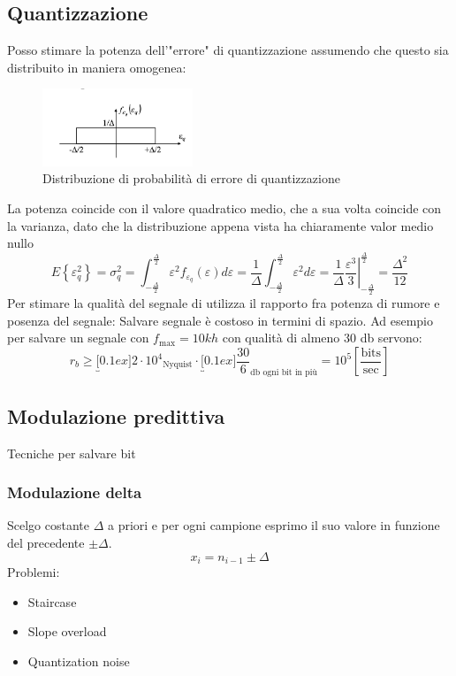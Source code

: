 \subsection{Quantizzazione}
Posso stimare la potenza dell'"errore" di quantizzazione assumendo che questo sia distribuito in maniera omogenea:
\begin{figure}[H]
	\begin{center}
		\includegraphics[width = 0.4\textwidth]{Images/Quantizzazione 1.png}
	\end{center}
	\caption{Distribuzione di probabilità di errore di quantizzazione}
\end{figure}
La potenza coincide con il valore quadratico medio, che a sua volta
coincide con la varianza, dato che la distribuzione appena vista ha
chiaramente valor medio nullo
\[
	E\left\{\varepsilon_q^2\right\}=\sigma_q^2=\int_{-\frac{\Delta}{2}}^{\frac{\Delta}{2}} \varepsilon^2 f_{\varepsilon_q}(\varepsilon) d \varepsilon=\frac{1}{\Delta} \int_{-\frac{\Delta}{2}}^{\frac{\Delta}{2}} \varepsilon^2 d \varepsilon=\left.\frac{1}{\Delta} \frac{\varepsilon^3}{3}\right|_{-\frac{\Delta}{2}} ^{\frac{\Delta}{2}}=\frac{\Delta^2}{12}
\]
Per stimare la qualità del segnale di utilizza il rapporto fra potenza di rumore e posenza del segnale:
Salvare segnale è costoso in termini di spazio. Ad esempio per salvare un segnale con $ f_{\text{max}} = 10 kh $ con qualità di almeno 30 db servono:
\[
	r_b \ge \underbracket[0.1ex]{2 \cdot  10^{4}}_{\text{Nyquist}} \cdot \underbracket[0.1ex]{\frac{30}{6}}_{\text{db ogni bit in più}} = 10^{5} \left[\frac{\text{bits}}{\text{sec}}\right]
\]
\subsection{Modulazione predittiva}
Tecniche per salvare bit
\subsubsection*{Modulazione delta}
Scelgo costante $ \Delta  $ a priori e per ogni campione esprimo il suo valore in funzione del precedente $ \pm \Delta  $.
\[
	x_i = n_{i-1} \pm \Delta
\]
Problemi:
\begin{itemize}
	\item Staircase
	\item Slope overload
	\item Quantization noise
\end{itemize}
